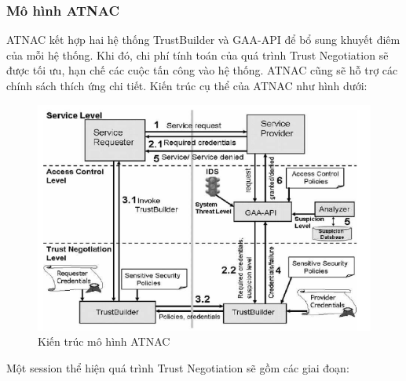 \documentclass[12pt]{article}
\begin{document}
\subsubsection{Mô hình ATNAC}
ATNAC kết hợp hai hệ thống TrustBuilder và GAA-API để bổ sung khuyết điêm của mỗi hệ thống. Khi đó, chi phí tính toán của quá trình Trust Negotiation sẽ được tối ưu, hạn chế các cuộc tấn công vào hệ thống. ATNAC cũng sẽ hỗ trợ các chính sách thích ứng chi tiết. Kiến trúc cụ thể của ATNAC như hình dưới:

\begin{figure}[H]
\centering
\includegraphics[scale=.7]{img/atnac.png}
\caption{Kiến trúc mô hình ATNAC}
\end{figure}
Một session thể hiện quá trình Trust Negotiation sẽ gồm các giai đoạn:
\end{document}
